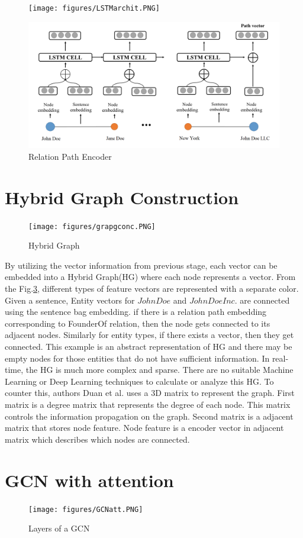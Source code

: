 \begin{figure}[h!]
	\centering
	\texttt{[image: figures/LSTMarchit.PNG]}
	\label{fig:lstmarchit}
\end{figure}

\begin{figure}[h!]
	\centering
	\includegraphics[scale=0.3]{figures/LSTM.PNG}
	\caption{Relation Path Encoder}
	\label{fig:lstm}
\end{figure}

\section{Hybrid Graph Construction}

\begin{figure}[h!]
	\centering
	\texttt{[image: figures/grapgconc.PNG]}
	\caption{Hybrid Graph}
	\label{fig:grapgconc}
\end{figure}

By utilizing the vector information from previous stage, each vector can be embedded into a Hybrid Graph(HG) where each node represents a vector. From the Fig.\ref{fig:grapgconc}, different types of feature vectors are represented with a separate color. Given a sentence, Entity vectors for $John Doe$ and $John Doe Inc$. are connected using the sentence bag embedding. if there is a relation path embedding corresponding to FounderOf relation, then the node gets connected to its adjacent nodes. Similarly for entity types, if there exists a vector, then they get connected. This example is an abstract representation of HG and there may be empty nodes for those entities that do not have sufficient information. In real-time, the HG is much more complex and sparse. There are no suitable Machine Learning or Deep Learning techniques to calculate or analyze this HG. To counter this, authors Duan et al.\cite{duan2019hybrid} uses a 3D matrix to represent the graph. First matrix is a degree matrix that represents the degree of each node. This matrix controls the information propagation on the graph. Second matrix is a adjacent matrix that stores node feature. Node feature is a encoder vector in adjacent matrix which describes which nodes are connected. 

\section{GCN with attention}

 
 
\begin{figure}[h!]
	\centering
	\texttt{[image: figures/GCNatt.PNG]}
	\caption{Layers of a GCN}
	\label{fig:GCNatt}
\end{figure}

